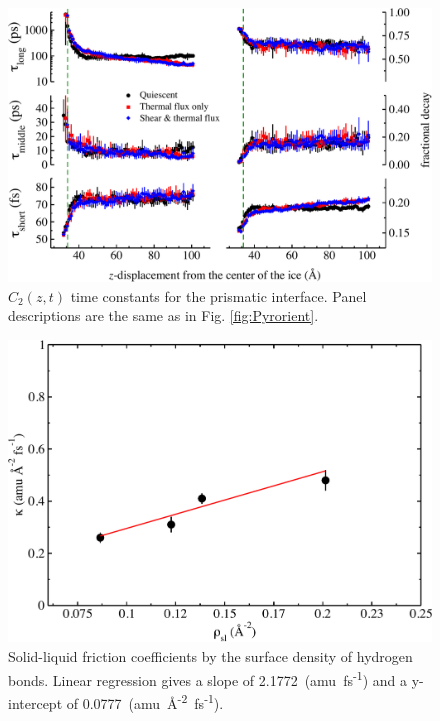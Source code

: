 \begin{figure}
\includegraphics[width=\linewidth]{Figures/Pri_lcorrz}
\caption{\label{fig:Porient} $C_2(z,t)$ time constants for the prismatic
  interface.  Panel descriptions are the same as in
  Fig. \ref{fig:Pyrorient}.}
\end{figure}
\begin{figure}
\includegraphics[width=\linewidth]{Figures/hb}
\caption{\label{fig:hbPlot} Solid-liquid friction coefficients by the
  surface density of hydrogen bonds. Linear regression gives a slope
  of 2.1772~(amu~fs\textsuperscript{-1}) and a y-intercept of
  0.0777~(amu~\AA\textsuperscript{-2}~fs\textsuperscript{-1}).} 
\end{figure}                                            
